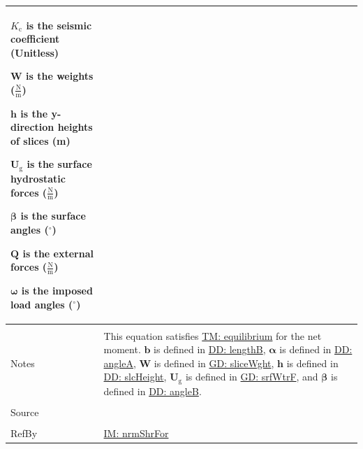 \documentclass[12pt]{article}
\begin{document}
\begin{minipage}{\textwidth}
\begin{tabular}{>{\raggedright}p{}>{\raggedright\arraybackslash}p{}}
\begin{symbDescription}
              \item{${K_{\text{c}}}$ is the seismic coefficient (Unitless)}
              \item{$\mathbf{W}$ is the weights ($\frac{\text{N}}{\text{m}}$)}
              \item{$\mathbf{h}$ is the y-direction heights of slices (m)}
              \item{${\mathbf{U}_{\text{g}}}$ is the surface hydrostatic forces ($\frac{\text{N}}{\text{m}}$)}
              \item{$\mathbf{β}$ is the surface angles (${}^{\circ}$)}
              \item{$\mathbf{Q}$ is the external forces ($\frac{\text{N}}{\text{m}}$)}
              \item{$\mathbf{ω}$ is the imposed load angles (${}^{\circ}$)}
              \end{symbDescription}
\\ \midrule \\
Notes & This equation satisfies \hyperref[TM:equilibrium]{TM: equilibrium} for the net moment. $\mathbf{b}$ is defined in \hyperref[DD:lengthB]{DD: lengthB}, $\mathbf{α}$ is defined in \hyperref[DD:angleA]{DD: angleA}, $\mathbf{W}$ is defined in \hyperref[GD:sliceWght]{GD: sliceWght}, $\mathbf{h}$ is defined in \hyperref[DD:slcHeight]{DD: slcHeight}, ${\mathbf{U}_{\text{g}}}$ is defined in \hyperref[GD:srfWtrF]{GD: srfWtrF}, and $\mathbf{β}$ is defined in \hyperref[DD:angleB]{DD: angleB}.
\\ \midrule \\
Source & \cite{chen2005}
\\ \midrule \\
RefBy & \hyperref[IM:nrmShrFor]{IM: nrmShrFor}
\\ \bottomrule
\end{tabular}
\end{minipage}
\end{document}
